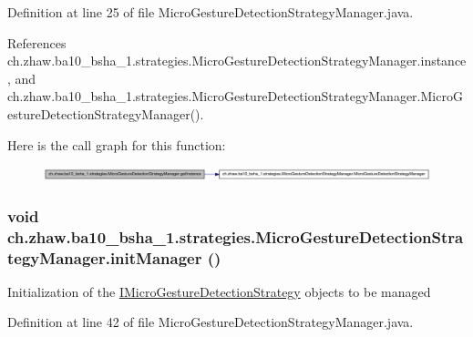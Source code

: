 Definition at line 25 of file MicroGestureDetectionStrategyManager.java.

References ch.zhaw.ba10\_\-bsha\_\-1.strategies.MicroGestureDetectionStrategyManager.instance, and ch.zhaw.ba10\_\-bsha\_\-1.strategies.MicroGestureDetectionStrategyManager.MicroGestureDetectionStrategyManager().

Here is the call graph for this function:\nopagebreak
\begin{figure}[H]
\begin{center}
\leavevmode
\includegraphics[width=420pt]{classch_1_1zhaw_1_1ba10__bsha__1_1_1strategies_1_1MicroGestureDetectionStrategyManager_addeac950c5b59e0e2e6079b4339e890e_cgraph}
\end{center}
\end{figure}
\hypertarget{classch_1_1zhaw_1_1ba10__bsha__1_1_1strategies_1_1MicroGestureDetectionStrategyManager_ac04ebafa1a206ed3350296dee2b66698}{
\subsubsection[{initManager}]{\setlength{\rightskip}{0pt plus 5cm}void ch.zhaw.ba10\_\-bsha\_\-1.strategies.MicroGestureDetectionStrategyManager.initManager ()}}
\label{classch_1_1zhaw_1_1ba10__bsha__1_1_1strategies_1_1MicroGestureDetectionStrategyManager_ac04ebafa1a206ed3350296dee2b66698}
Initialization of the \hyperlink{interfacech_1_1zhaw_1_1ba10__bsha__1_1_1strategies_1_1IMicroGestureDetectionStrategy}{IMicroGestureDetectionStrategy} objects to be managed 

Definition at line 42 of file MicroGestureDetectionStrategyManager.java.

